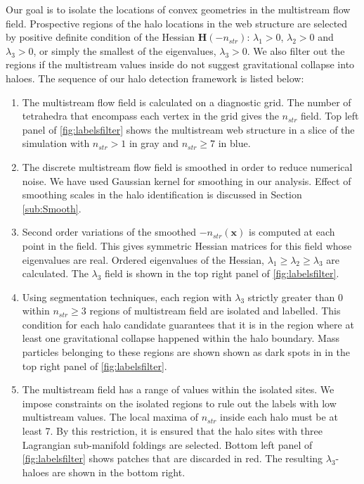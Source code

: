 {Our goal is to isolate the locations of convex geometries in the multistream flow field. Prospective regions of the halo locations in the web structure are selected by positive definite condition of the Hessian $\mathbf{H}(-n_{str})$: $\lambda_1 > 0$, $\lambda_2 > 0$ and  $\lambda_3 > 0$, or simply the smallest of the eigenvalues, $\lambda_3 > 0$. We also filter out the regions if the multistream values inside do not suggest gravitational collapse into haloes. The sequence of our halo detection framework is listed below: 


\begin{enumerate}
\item The multistream flow field is calculated on a diagnostic grid. The number of tetrahedra that encompass each vertex in the grid gives the $n_{str}$ field. Top left panel of \autoref{fig:labelsfilter} shows the multistream web structure in a slice of the simulation with $n_{str} > 1$ in gray and $n_{str} \geq 7$ in blue.  

\item The discrete multistream flow field is smoothed in order to reduce numerical noise. We have used Gaussian kernel for smoothing in our analysis. Effect of smoothing scales in the halo identification is discussed in Section \ref{sub:Smooth}. 

\item Second order variations of the smoothed $-n_{str}(\mathbf{x})$ is computed at each point in the field. This gives symmetric Hessian matrices for this field whose eigenvalues are real. Ordered eigenvalues of the Hessian, $ \lambda_1 \geq  \lambda_2 \geq \lambda_3$ are calculated. The $\lambda_3$ field is shown in the top right panel of \autoref{fig:labelsfilter}. 

\item Using segmentation techniques, each region with $ \lambda_3 $ strictly greater than $0$ within $n_{str} \geq 3$ regions of multistream field are isolated and labelled. This condition for each halo candidate guarantees that it is in the region where at least one gravitational collapse happened within the halo boundary. Mass particles belonging to these regions are shown shown as dark spots in in the top right panel of \autoref{fig:labelsfilter}. 

\item The multistream field has a range of values within the isolated sites. We impose constraints on the isolated regions to rule out the labels with low multistream values. The local maxima of $n_{str}$ inside each halo must be at least 7. By this restriction, it is ensured that the halo sites with three Lagrangian sub-manifold foldings are selected. Bottom left panel of \autoref{fig:labelsfilter} shows patches that are discarded in red. The resulting $\lambda_3$-haloes are shown in the bottom right.  
  


\end{enumerate}}
